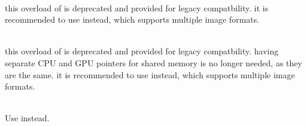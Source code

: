 \begin{DoxyRefList}
\item[{\parbox[t]{\linewidth}{Member \doxylink{group__image_ga6e2a8dafbe55bf80c3f82a67f27434dd}{load\+Image\+RGBA} (const char \texorpdfstring{$\ast$}{*}filename, float4 \texorpdfstring{$\ast$}{*}\texorpdfstring{$\ast$}{*}ptr, int \texorpdfstring{$\ast$}{*}width, int \texorpdfstring{$\ast$}{*}height, cuda\+Stream\+\_\+t stream=0)}}]\hfill \\
\label{deprecated__deprecated000028}%
%
this overload of  is deprecated and provided for legacy compatbility. it is recommended to use  instead, which supports multiple image formats.


\item[{\parbox[t]{\linewidth}{Member \doxylink{group__image_ga84d292def151b0d9f3cb1e32b0dcdcb7}{load\+Image\+RGBA} (const char \texorpdfstring{$\ast$}{*}filename, float4 \texorpdfstring{$\ast$}{*}\texorpdfstring{$\ast$}{*}cpu, float4 \texorpdfstring{$\ast$}{*}\texorpdfstring{$\ast$}{*}gpu, int \texorpdfstring{$\ast$}{*}width, int \texorpdfstring{$\ast$}{*}height, cuda\+Stream\+\_\+t stream=0)}}]\hfill \\
\label{deprecated__deprecated000029}%
%
this overload of  is deprecated and provided for legacy compatbility. having separate CPU and GPU pointers for shared memory is no longer needed, as they are the same. it is recommended to use  instead, which supports multiple image formats.


\item[{\parbox[t]{\linewidth}{Member \doxylink{group__ee__nvbuffering__group_gab159c94c574f75a3d7913bef8352722a}{Nv\+Buffer\+Create} (int \texorpdfstring{$\ast$}{*}dmabuf\+\_\+fd, int width, int height, \doxylink{group__ee__nvbuffering__group_gaafbd12ab7003d1090eb4a5791758198e}{Nv\+Buffer\+Layout} layout, \doxylink{group__ee__nvbuffering__group_gaae53b45fe3f04b8f9135cb80baeac6e4}{Nv\+Buffer\+Color\+Format} color\+Format)}}]\hfill \\
\label{deprecated__deprecated000019}%
%
Use  instead. 


\end{DoxyRefList}
